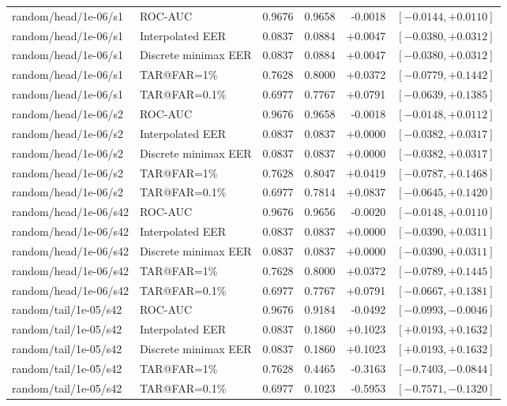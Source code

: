 \begin{table}[!t]
\begin{tabular}{@{}llrrrr@{}}
random/head/1e-06/s1 & ROC-AUC & 0.9676 & 0.9658 & -0.0018 & $[-0.0144,+0.0110]$ \\
random/head/1e-06/s1 & Interpolated EER & 0.0837 & 0.0884 & +0.0047 & $[-0.0380,+0.0312]$ \\
random/head/1e-06/s1 & Discrete minimax EER & 0.0837 & 0.0884 & +0.0047 & $[-0.0380,+0.0312]$ \\
random/head/1e-06/s1 & TAR@FAR=1\% & 0.7628 & 0.8000 & +0.0372 & $[-0.0779,+0.1442]$ \\
random/head/1e-06/s1 & TAR@FAR=0.1\% & 0.6977 & 0.7767 & +0.0791 & $[-0.0639,+0.1385]$ \\
random/head/1e-06/s2 & ROC-AUC & 0.9676 & 0.9658 & -0.0018 & $[-0.0148,+0.0112]$ \\
random/head/1e-06/s2 & Interpolated EER & 0.0837 & 0.0837 & +0.0000 & $[-0.0382,+0.0317]$ \\
random/head/1e-06/s2 & Discrete minimax EER & 0.0837 & 0.0837 & +0.0000 & $[-0.0382,+0.0317]$ \\
random/head/1e-06/s2 & TAR@FAR=1\% & 0.7628 & 0.8047 & +0.0419 & $[-0.0787,+0.1468]$ \\
random/head/1e-06/s2 & TAR@FAR=0.1\% & 0.6977 & 0.7814 & +0.0837 & $[-0.0645,+0.1420]$ \\
random/head/1e-06/s42 & ROC-AUC & 0.9676 & 0.9656 & -0.0020 & $[-0.0148,+0.0110]$ \\
random/head/1e-06/s42 & Interpolated EER & 0.0837 & 0.0837 & +0.0000 & $[-0.0390,+0.0311]$ \\
random/head/1e-06/s42 & Discrete minimax EER & 0.0837 & 0.0837 & +0.0000 & $[-0.0390,+0.0311]$ \\
random/head/1e-06/s42 & TAR@FAR=1\% & 0.7628 & 0.8000 & +0.0372 & $[-0.0789,+0.1445]$ \\
random/head/1e-06/s42 & TAR@FAR=0.1\% & 0.6977 & 0.7767 & +0.0791 & $[-0.0667,+0.1381]$ \\
random/tail/1e-05/s42 & ROC-AUC & 0.9676 & 0.9184 & -0.0492 & $[-0.0993,-0.0046]$ \\
random/tail/1e-05/s42 & Interpolated EER & 0.0837 & 0.1860 & +0.1023 & $[+0.0193,+0.1632]$ \\
random/tail/1e-05/s42 & Discrete minimax EER & 0.0837 & 0.1860 & +0.1023 & $[+0.0193,+0.1632]$ \\
random/tail/1e-05/s42 & TAR@FAR=1\% & 0.7628 & 0.4465 & -0.3163 & $[-0.7403,-0.0844]$ \\
random/tail/1e-05/s42 & TAR@FAR=0.1\% & 0.6977 & 0.1023 & -0.5953 & $[-0.7571,-0.1320]$ \\

\end{tabular}
\end{table}
